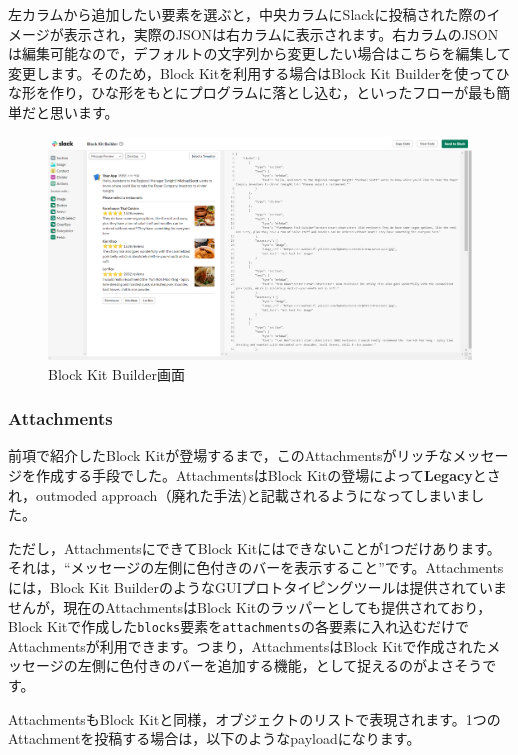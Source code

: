 \documentclass[uplatex,a4j]{jsarticle}
\begin{document}
左カラムから追加したい要素を選ぶと，中央カラムにSlackに投稿された際のイメージが表示され，実際のJSONは右カラムに表示されます。右カラムのJSONは編集可能なので，デフォルトの文字列から変更したい場合はこちらを編集して変更します。そのため，Block Kitを利用する場合はBlock Kit Builderを使ってひな形を作り，ひな形をもとにプログラムに落とし込む，といったフローが最も簡単だと思います。

\begin{figure}[H]
 \centering
 \includegraphics[keepaspectratio, scale=0.35]{images/block_kit_builder.png}
 \caption{Block Kit Builder画面}
 \label{fig:block_kit_builder}
\end{figure}

\subsubsection{Attachments}

前項で紹介したBlock Kitが登場するまで，このAttachmentsがリッチなメッセージを作成する手段でした。AttachmentsはBlock Kitの登場によって\textbf{Legacy}とされ，outmoded approach（廃れた手法)と記載されるようになってしまいました。

ただし，AttachmentsにできてBlock Kitにはできないことが1つだけあります。それは，``メッセージの左側に色付きのバーを表示すること''です。Attachmentsには，Block Kit BuilderのようなGUIプロトタイピングツールは提供されていませんが，現在のAttachmentsはBlock Kitのラッパーとしても提供されており，Block Kitで作成した\verb|blocks|要素を\verb|attachments|の各要素に入れ込むだけでAttachmentsが利用できます。つまり，AttachmentsはBlock Kitで作成されたメッセージの左側に色付きのバーを追加する機能，として捉えるのがよさそうです。

AttachmentsもBlock Kitと同様，オブジェクトのリストで表現されます。1つのAttachmentを投稿する場合は，以下のようなpayloadになります。
\end{document}
